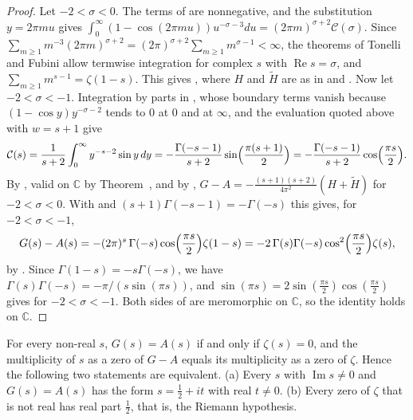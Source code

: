 \begin{proof}
Let $-2<\sigma<0$. The terms of  are nonnegative, and the substitution $y=2\pi mu$ gives $\int_0^\infty(1-\cos(2\pi mu))u^{-\sigma-3}du=(2\pi m)^{\sigma+2}\mathcal C(\sigma)$. Since $\sum_{m\ge1}m^{-3}(2\pi m)^{\sigma+2}=(2\pi)^{\sigma+2}\sum_{m\ge1}m^{\sigma-1}<\infty$, the theorems of Tonelli and Fubini allow termwise integration for complex $s$ with $\operatorname{Re}s=\sigma$, and $\sum_{m\ge1}m^{s-1}=\zeta(1-s)$. This gives , where $H$ and $\widetilde H$ are as in  and . Now let $-2<\sigma<-1$. Integration by parts in , whose boundary terms vanish because $(1-\cos y)y^{-\sigma-2}$ tends to $0$ at $0$ and at $\infty$, and the evaluation quoted above with $w=s+1$ give
\begin{equation}\label{eq:Cgamma}
\mathcal C(s)=\frac1{s+2}\int_0^\infty y^{-s-2}\sin y\,dy=-\frac{\Gamma(-s-1)}{s+2}\sin\Bigl(\frac{\pi(s+1)}2\Bigr)=-\frac{\Gamma(-s-1)}{s+2}\cos\Bigl(\frac{\pi s}2\Bigr).
\end{equation}
By , valid on $\mathbb C$ by Theorem~, and by , $G-A=-\frac{(s+1)(s+2)}{4\pi^2}(H+\widetilde H)$ for $-2<\sigma<0$. With  and $(s+1)\Gamma(-s-1)=-\Gamma(-s)$ this gives, for $-2<\sigma<-1$,
\begin{equation}\label{eq:GAgamma}
G(s)-A(s)=-(2\pi)^s\,\Gamma(-s)\cos\Bigl(\frac{\pi s}2\Bigr)\zeta(1-s)=-2\,\Gamma(s)\Gamma(-s)\cos^2\Bigl(\frac{\pi s}2\Bigr)\zeta(s),
\end{equation}
by . Since $\Gamma(1-s)=-s\Gamma(-s)$, we have $\Gamma(s)\Gamma(-s)=-\pi/(s\sin(\pi s))$, and $\sin(\pi s)=2\sin(\frac{\pi s}2)\cos(\frac{\pi s}2)$ gives  for $-2<\sigma<-1$. Both sides of  are meromorphic on $\mathbb C$, so the identity holds on $\mathbb C$.
\end{proof}

\begin{corollary}\label{cor:RH}
For every non-real $s$, $G(s)=A(s)$ if and only if $\zeta(s)=0$, and the multiplicity of $s$ as a zero of $G-A$ equals its multiplicity as a zero of $\zeta$. Hence the following two statements are equivalent.
\textup{(a)} Every $s$ with $\operatorname{Im}s\ne0$ and $G(s)=A(s)$ has the form $s=\frac12+it$ with real $t\ne0$.
\textup{(b)} Every zero of $\zeta$ that is not real has real part $\frac12$, that is, the Riemann hypothesis.
\end{corollary}

